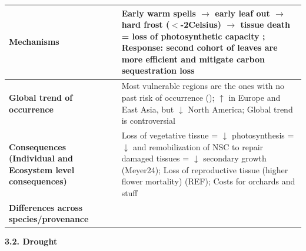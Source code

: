 \documentclass{article}
\begin{document}
\begin{enumerate}
{\begin{tabular}{|>{\raggedright\arraybackslash}p{4cm}|p{12cm}|}
\textbf{Mechanisms} & Early warm spells $\rightarrow$ early leaf out $\rightarrow$ hard frost ($<$-2Celsius) $\rightarrow$ tissue death = loss of photosynthetic capacity \cite{polgar_leafout_2011}; Response: second cohort of leaves are more efficient and mitigate carbon sequestration loss \cite{reinmann_compensatory_2023} \\
\hline
\textbf{Global trend of occurrence} & Most vulnerable regions are the ones with no past risk of occurrence (); $\uparrow$ in Europe and East Asia, but $\downarrow$ North America; Global trend is controversial \cite{reinmann_compensatory_2023} \\
\hline
\textbf{Consequences (Individual and Ecosystem level consequences)} & Loss of vegetative tissue = $\downarrow$ photosynthesis = $\downarrow$ and remobilization of NSC to repair damaged tissues = $\downarrow$ secondary growth (Meyer24); Loss of reproductive tissue (higher flower mortality) (REF); Costs for orchards and stuff \cite{reinmann_compensatory_2023} \\
\hline
\textbf{Differences across species/provenance} & \\
\hline
\end{tabular}
} 

\clearpage
	\textbf{3.2. Drought} \\
\end{enumerate}
\end{document}
